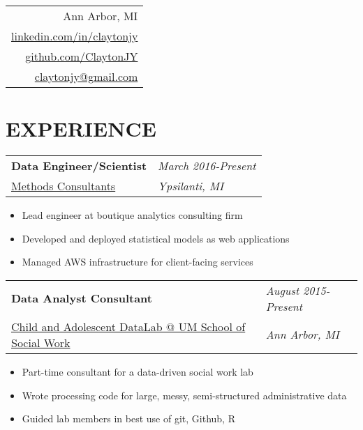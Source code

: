 \documentclass[margin,line]{res}
\begin{document}


\begin{resume}

\vspace{-.15in}
\hfill
\begin{tabular}{r}
  Ann Arbor, MI\\
  \href{http://www.linkedin.com/in/claytonjy}{linkedin.com/in/claytonjy}\\
  \href{https://github.com/ClaytonJY}{github.com/ClaytonJY} \\
  \href{mailto:claytonjy@gmail.com}{claytonjy@gmail.com} \\
\end{tabular}


\section{EXPERIENCE}

\begin{tabular}{p{4.4in} l}
  {\bf Data Engineer/Scientist} & \emph{March 2016-Present}\\
  \href{http://www.methodsconsultants.com/}{Methods Consultants} & \emph{Ypsilanti, MI}
\end{tabular}
\vspace{2pt}
\begin{itemize}\itemsep -2pt
  \item Lead engineer at boutique analytics consulting firm
  \item Developed and deployed statistical models as web applications
  \item Managed AWS infrastructure for client-facing services
\end{itemize}

\begin{tabular}{p{4.4in} l}
  {\bf Data Analyst Consultant} & \emph{August 2015-Present}\\
  \href{http://www.ssw-datalab.org/}{Child and Adolescent DataLab @ UM School of Social Work} & \emph{Ann Arbor, MI}
\end{tabular}
\vspace{2pt}
\begin{itemize}\itemsep -2pt
  \item Part-time consultant for a data-driven social work lab
  \item Wrote processing code for large, messy, semi-structured administrative data
  \item Guided lab members in best use of git, Github, R
\end{itemize}


\end{resume}
\end{document}
